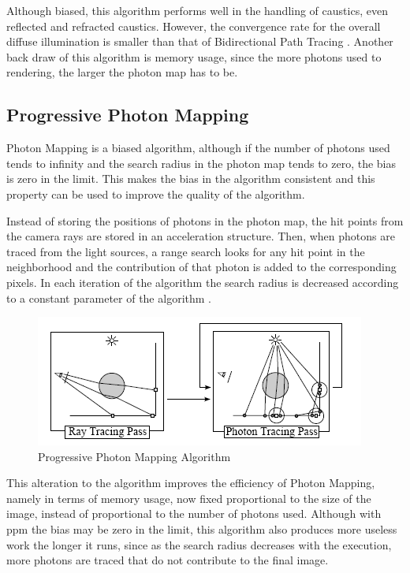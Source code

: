 Although biased, this algorithm performs well in the handling of caustics, even reflected and refracted caustics. However, the convergence rate for the overall diffuse illumination is smaller than that of Bidirectional Path Tracing \citep{Georgiev}. Another back draw of this algorithm is memory usage, since the more photons used to rendering, the larger the photon map has to be.

\subsection{Progressive Photon Mapping}

Photon Mapping is a biased algorithm, although if the number of photons used tends to infinity and the search radius in the photon map tends to zero, the bias is zero in the limit. This makes the bias in the algorithm consistent and this property can be used to improve the quality of the algorithm.

Instead of storing the positions of photons in the photon map, the hit points from the camera rays are stored in an acceleration structure. Then, when photons are traced from the light sources, a range search looks for any hit point in the neighborhood and the contribution of that photon is added to the corresponding pixels. In each iteration of the algorithm the search radius is decreased according to a constant parameter of the algorithm \citep{Hachisuka}.

\begin{figure}[H]
\centering
\includegraphics[width=0.75\linewidth]{img/ppmDiagram.png}
\caption{\label{img:ppmdiag} Progressive Photon Mapping Algorithm}
\end{figure}

This alteration to the algorithm improves the efficiency of Photon Mapping, namely in terms of memory usage, now fixed proportional to the size of the image, instead of proportional to the number of photons used. Although with \gls{ppm} the bias may be zero in the limit, this algorithm also produces more useless work the longer it runs, since as the search radius decreases with the execution, more photons are traced that do not contribute to the final image.

